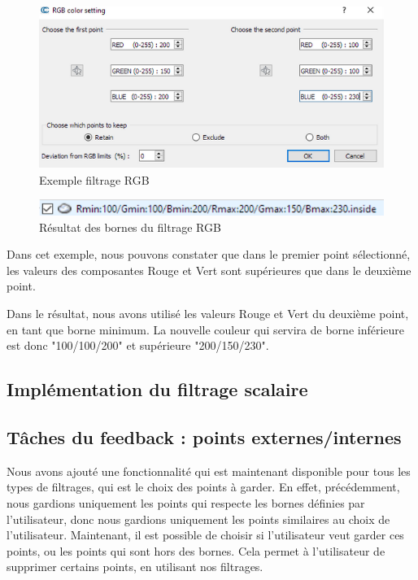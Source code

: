 \documentclass[12pt,titlepage,french]{article}
\begin{document}
\begin{figure}[H]
 \caption{\label{} Exemple filtrage RGB}
 \begin{center}
 \includegraphics[width=1\textwidth]{./img/rgb_ui.PNG}
  \end{center}
\end{figure}

\begin{figure}[H]
 \caption{\label{} Résultat des bornes du filtrage RGB}
 \begin{center}
 \includegraphics[width=1\textwidth]{./img/rgb_res.PNG}
  \end{center}
\end{figure}

Dans cet exemple, nous pouvons constater que dans le premier point sélectionné, les valeurs des composantes Rouge et Vert sont supérieures que dans le deuxième point. \newline

Dans le résultat, nous avons utilisé les valeurs Rouge et Vert du deuxième point, en tant que borne minimum. La nouvelle couleur qui servira de borne inférieure est donc "100/100/200" et supérieure "200/150/230".

\subsection{Implémentation du filtrage scalaire}

\subsection{Tâches du feedback : points externes/internes}

Nous avons ajouté une fonctionnalité qui est maintenant disponible pour tous les types de filtrages, qui est le choix des points à garder. En effet, précédemment, nous gardions uniquement les points qui respecte les bornes définies par l'utilisateur, donc nous gardions uniquement les points similaires au choix de l'utilisateur. Maintenant, il est possible de choisir si l'utilisateur veut garder ces points, ou les points qui sont hors des bornes. Cela permet à l'utilisateur de supprimer certains points, en utilisant nos filtrages. \newline
\end{document}
